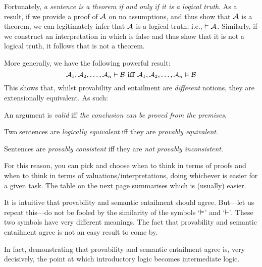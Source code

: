 Fortunately, \emph{a sentence is a theorem if and only if it is a logical truth}. As a result, if we provide a proof of $\mathcal{A}$ on no assumptions, and thus show that $\mathcal{A}$ is a theorem, we can legitimately infer that $\mathcal{A}$ is a logical truth; i.e., $\vDash\mathcal{A}$. Similarly, if we construct an interpretation in which  is false and thus show that it is not a logical truth, it follows that  is not a theorem.

More generally, we have the following powerful result:
$$\mathcal{A}_1, \mathcal{A}_2, \ldots, \mathcal{A}_n \vdash\mathcal{B} \textbf{ iff }\mathcal{A}_1, \mathcal{A}_2, \ldots, \mathcal{A}_n \vDash\mathcal{B}$$
This shows that, whilst provability and entailment are \emph{different} notions, they are extensionally equivalent. As such:
	\begin{ebullet}
		\item An argument is \emph{valid} iff \emph{the conclusion can be proved from the premises}.
		\item Two sentences are \emph{logically equivalent} iff they are \emph{provably equivalent}.
		\item Sentences are \emph{provably consistent} iff they are \emph{not provably inconsistent}.
	\end{ebullet}
For this reason, you can pick and choose when to think in terms of proofs and when to think in terms of valuations/interpretations, doing whichever is easier for a given task. The table on the next page summarises which is (usually) easier.

It is intuitive that provability and semantic entailment should agree. But---let us repeat this---do not be fooled by the similarity of the symbols `$\vDash$' and `$\vdash$'. These two symbols have very different meanings. The fact that provability and semantic entailment agree is not an easy result to come by. 

In fact, demonstrating that provability and semantic entailment agree is, very decisively, the point at which introductory logic becomes intermediate logic.

